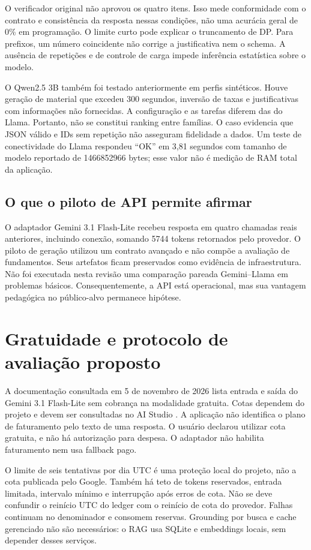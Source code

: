 \documentclass[12pt]{article}
\begin{document}
O verificador original não aprovou os quatro itens. Isso mede conformidade com o contrato e consistência da resposta nessas condições, não uma acurácia geral de 0\% em programação. O limite curto pode explicar o truncamento de DP. Para prefixos, um número coincidente não corrige a justificativa nem o schema. A ausência de repetições e de controle de carga impede inferência estatística sobre o modelo.

O Qwen2.5 3B também foi testado anteriormente em perfis sintéticos. Houve geração de material que excedeu 300 segundos, inversão de taxas e justificativas com informações não fornecidas. A configuração e as tarefas diferem das do Llama. Portanto, não se constitui ranking entre famílias. O caso evidencia que JSON válido e IDs sem repetição não asseguram fidelidade a dados. Um teste de conectividade do Llama respondeu ``OK'' em 3,81 segundos com tamanho de modelo reportado de 1466852966 bytes; esse valor não é medição de RAM total da aplicação.

\subsection{O que o piloto de API permite afirmar}
O adaptador Gemini 3.1 Flash-Lite recebeu resposta em quatro chamadas reais anteriores, incluindo conexão, somando 5744 tokens retornados pelo provedor. O piloto de geração utilizou um contrato avançado e não compõe a avaliação de fundamentos. Seus artefatos ficam preservados como evidência de infraestrutura. Não foi executada nesta revisão uma comparação pareada Gemini--Llama em problemas básicos. Consequentemente, a API está operacional, mas sua vantagem pedagógica no público-alvo permanece hipótese.

\section{Gratuidade e protocolo de avaliação proposto}
A documentação consultada em 5 de novembro de 2026 lista entrada e saída do Gemini 3.1 Flash-Lite sem cobrança na modalidade gratuita. Cotas dependem do projeto e devem ser consultadas no AI Studio \cite{googlefree2026}. A aplicação não identifica o plano de faturamento pelo texto de uma resposta. O usuário declarou utilizar cota gratuita, e não há autorização para despesa. O adaptador não habilita faturamento nem usa fallback pago.

O limite de seis tentativas por dia UTC é uma proteção local do projeto, não a cota publicada pelo Google. Também há teto de tokens reservados, entrada limitada, intervalo mínimo e interrupção após erros de cota. Não se deve confundir o reinício UTC do ledger com o reinício de cota do provedor. Falhas continuam no denominador e consomem reservas. Grounding por busca e cache gerenciado não são necessários: o RAG usa SQLite e embeddings locais, sem depender desses serviços.
\end{document}
